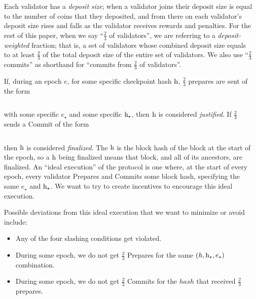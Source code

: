 \documentclass[12pt, final]{article}
\newcommand{\epoch}{\ensuremath{e}}
\newcommand{\hash}{\textnormal{h}}
\newcommand{\hashsource}{\hash_{\star}\xspace}
\newcommand{\epochsource}{\epoch_{\star}\xspace}
\begin{document}
Each validator has a \emph{deposit size}; when a validator joins their deposit size is equal to the number of coins that they deposited, and from there on each validator's deposit size rises and falls as the validator receives rewards and penalties. For the rest of this paper, when we say ``$\frac{2}{3}$ of validators'', we are referring to a \emph{deposit-weighted} fraction; that is, a set of validators whose combined deposit size equals to at least $\frac{2}{3}$ of the total deposit size of the entire set of validators. We also use ``$\frac{2}{3}$ commits'' as shorthand for ``commits from $\frac{2}{3}$ of validators''.

If, during an epoch $\epoch$, for some specific checkpoint hash $\hash$, $\frac{2}{3}$ prepares are sent of the form 

\begin{equation}
[PREPARE, \epoch, \hash, \epochsource, \hashsource]
\end{equation}

with some specific $\epochsource$ and some specific $\hashsource$, then $\hash$ is considered \emph{justified}. If $\frac{2}{3}$ sends a Commit of the form 

\begin{equation}
[COMMIT, \epoch, \hash]
\end{equation}

then $\hash$ is considered \emph{finalized}. The $\hash$ is the block hash of the block at the start of the epoch, so a $\hash$ being finalized means that block, and all of its ancestors, are finalized. An ``ideal execution'' of the protocol is one where, at the start of every epoch, every validator Prepares and Commits some block hash, specifying the same $\epochsource$ and $\hashsource$. We want to try to create incentives to encourage this ideal execution.

Possible deviations from this ideal execution that we want to minimize or avoid include:

\begin{itemize}
\item Any of the four slashing conditions \cite{minslashing} get violated.
\item During some epoch, we do not get $\frac{2}{3}$ Prepares for the same $(h, \hashsource, \epochsource)$ combination.
\item During some epoch, we do not get $\frac{2}{3}$ Commits for the $hash$ that received $\frac{2}{3}$ prepares. 
\end{itemize}
\end{document}
